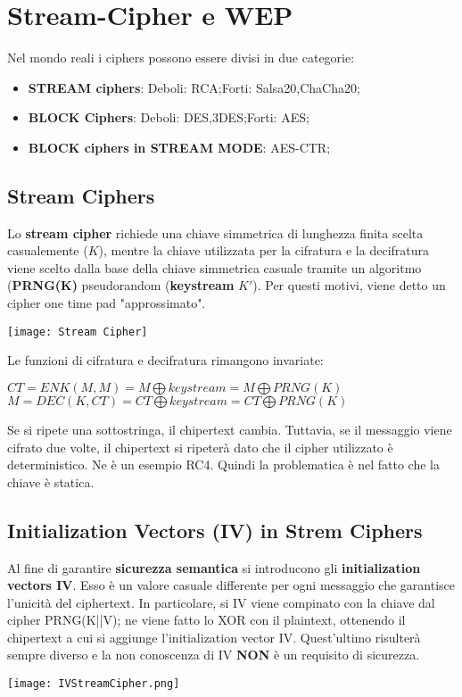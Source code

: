 \documentclass{article}
\theoremstyle{remark}
\begin{document}
\section{Stream-Cipher e WEP}
Nel mondo reali i ciphers possono essere divisi in due categorie:\begin{itemize}
    \item \textbf{STREAM ciphers}: \newline Deboli: RCA;\newline Forti: Salsa20,ChaCha20;
    \item \textbf{BLOCK Ciphers}: \newline Deboli: DES,3DES;\newline Forti: AES;
    \item \textbf{BLOCK ciphers in STREAM MODE}: \newline AES-CTR;
\end{itemize}
\subsection{Stream Ciphers}
Lo \textbf{stream cipher} richiede una chiave simmetrica di lunghezza finita scelta casualemente ($K$), mentre la chiave utilizzata per la cifratura e la decifratura viene scelto dalla base della chiave simmetrica casuale tramite un algoritmo (\textbf{PRNG(K)} pseudorandom (\textbf{keystream} $K'$). Per questi motivi, viene detto un cipher one time pad "approssimato".
\begin{center}
    \texttt{[image: Stream Cipher]}
\end{center}
Le funzioni di cifratura e decifratura rimangono invariate:
\begin{center}
    $CT= ENK(M,M)=M \bigoplus keystream = M \bigoplus PRNG(K)$
    $M = DEC(K,CT) = CT \bigoplus keystream = CT \bigoplus PRNG(K)$
\end{center}
Se si ripete una sottostringa, il chipertext cambia. Tuttavia, se il messaggio viene cifrato due volte, il chipertext si ripeterà dato che il cipher utilizzato è deterministico. Ne è un esempio RC4.\newline
Quindi la problematica è nel fatto che la chiave è statica.
\subsection{Initialization Vectors (IV) in Strem Ciphers}
Al fine di garantire \textbf{sicurezza semantica} si introducono gli \textbf{initialization vectors IV}. Esso è un valore casuale differente per ogni messaggio che garantisce l'unicità del ciphertext. 
In particolare, si IV viene compinato con la chiave dal cipher PRNG(K||V); ne viene fatto lo XOR con il plaintext, ottenendo il chipertext a cui si aggiunge l'initialization vector IV. Quest'ultimo risulterà sempre diverso e la non conoscenza di IV \textbf{NON} è un requisito di sicurezza.
\begin{center}
    \texttt{[image: IVStreamCipher.png]}
\end{center}
\end{document}
